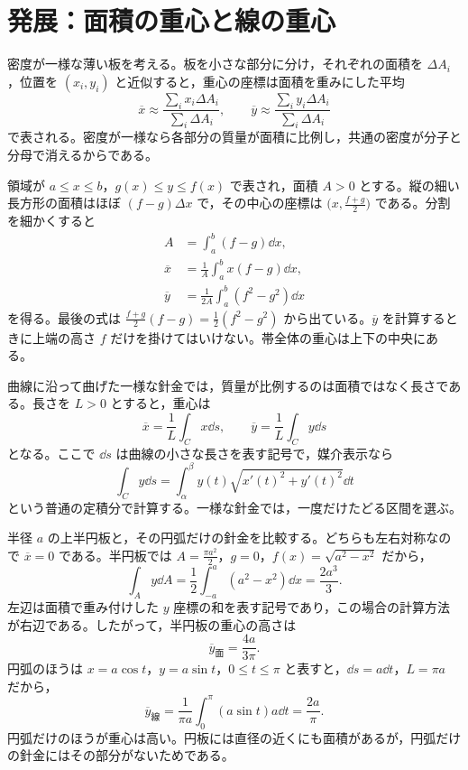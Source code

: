 \section{発展：面積の重心と線の重心}\label{節:面積重心と線重心}

密度が一様な薄い板を考える。板を小さな部分に分け，それぞれの面積を $\Delta A_i$，位置を $(x_i,y_i)$ と近似すると，重心の座標は面積を重みにした平均
\[
\overline x\approx\frac{\sum_i x_i\Delta A_i}{\sum_i\Delta A_i},\qquad
\overline y\approx\frac{\sum_i y_i\Delta A_i}{\sum_i\Delta A_i}
\]
で表される。密度が一様なら各部分の質量が面積に比例し，共通の密度が分子と分母で消えるからである。

領域が $a\leq x\leq b$，$g(x)\leq y\leq f(x)$ で表され，面積 $A>0$ とする。縦の細い長方形の面積はほぼ $(f-g)\Delta x$ で，その中心の座標は $\bigl(x,\frac{f+g}{2}\bigr)$ である。分割を細かくすると
\begin{equation}\label{式:面積の重心}
\begin{aligned}
A&=\int_a^b(f-g)\dd x,\\
\overline x&=\frac1A\int_a^b x(f-g)\dd x,\\
\overline y&=\frac1{2A}\int_a^b(f^2-g^2)\dd x
\end{aligned}
\end{equation}
を得る。最後の式は $\frac{f+g}{2}(f-g)=\frac12(f^2-g^2)$ から出ている。$\overline y$ を計算するときに上端の高さ $f$ だけを掛けてはいけない。帯全体の重心は上下の中央にある。

曲線に沿って曲げた一様な針金では，質量が比例するのは面積ではなく長さである。長さを $L>0$ とすると，重心は
\begin{equation}\label{式:線の重心}
\overline x=\frac1L\int_C x\dd s,\qquad
\overline y=\frac1L\int_C y\dd s
\end{equation}
となる。ここで $\dd s$ は曲線の小さな長さを表す記号で，媒介表示なら
\[
\int_C y\dd s
 =\int_\alpha^\beta y(t)\sqrt{x'(t)^2+y'(t)^2}\dd t
\]
という普通の定積分で計算する。一様な針金では，一度だけたどる区間を選ぶ。

半径 $a$ の上半円板と，その円弧だけの針金を比較する。どちらも左右対称なので $\overline x=0$ である。半円板では $A=\frac{\pi a^2}{2}$，$g=0$，$f(x)=\sqrt{a^2-x^2}$ だから，
\[
\int_A y\dd A
 =\frac12\int_{-a}^a(a^2-x^2)\dd x
 =\frac{2a^3}{3}.
\]
左辺は面積で重み付けした $y$ 座標の和を表す記号であり，この場合の計算方法が右辺である。したがって，半円板の重心の高さは
\begin{equation}\label{式:半円板の重心}
\overline y_{\mathrm{面}}=\frac{4a}{3\pi}.
\end{equation}
円弧のほうは $x=a\cos t$，$y=a\sin t$，$0\leq t\leq\pi$ と表すと，$\dd s=a\dd t$，$L=\pi a$ だから，
\begin{equation}\label{式:半円弧の重心}
\overline y_{\mathrm{線}}
 =\frac{1}{\pi a}\int_0^\pi(a\sin t)a\dd t
 =\frac{2a}{\pi}.
\end{equation}
円弧だけのほうが重心は高い。円板には直径の近くにも面積があるが，円弧だけの針金にはその部分がないためである。

